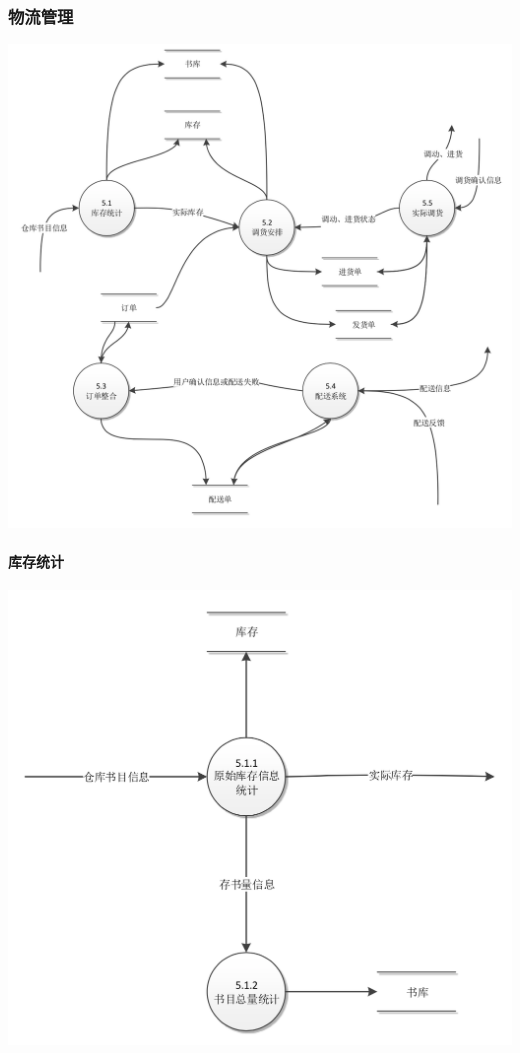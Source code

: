 \subsubsection{物流管理}
\begin{center}
    \includegraphics[width=1\linewidth]{img/5.png}
\end{center}
\paragraph{库存统计}
\begin{center}
    \includegraphics[width=1\linewidth]{img/5.1.png}
\end{center}

